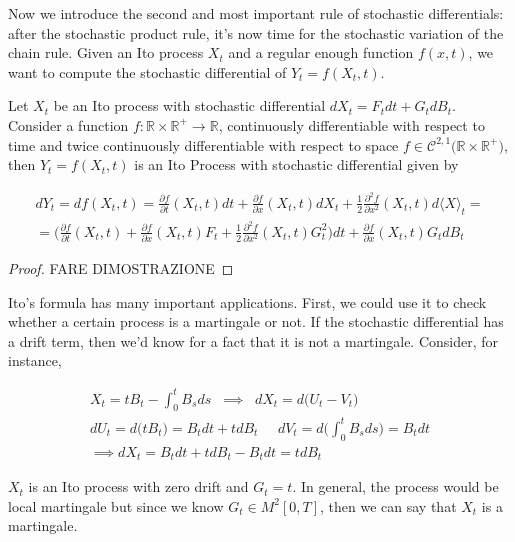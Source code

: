 Now we introduce the second and most important rule of stochastic differentials: after the stochastic product rule, it's now time for the stochastic variation of the chain rule. Given an Ito process $X_t$ and a regular enough function $f(x,t)$, we want to compute the stochastic differential of $Y_t = f(X_t,t)$. 

\begin{theorem}
    Let $X_t$ be an Ito process with stochastic differential $dX_t = F_t dt + G_t dB_t$. Consider a function $f : \mathbb{R} \times \mathbb{R}^+ \to \mathbb{R}$, continuously differentiable with respect to time and twice continuously differentiable with respect to space $f \in \mathcal{C}^{2,1}\big(\mathbb{R} \times \mathbb{R}^+\big)$, then $Y_t = f(X_t,t)$ is an Ito Process with stochastic differential given by

    \begin{gather}
        dY_t = df(X_t,t) = \frac{\partial f}{\partial t}(X_t, t)dt+\frac{\partial f}{\partial x}(X_t,t) dX_t + \frac{1}{2}\frac{\partial^2 f}{\partial x^2}(X_t,t) d\langle X \rangle_t = \\
        = \Big( \frac{\partial f}{\partial t}(X_t,t) + \frac{\partial f}{\partial x}(X_t,t) F_t + \frac{1}{2} \frac{\partial^2 f}{\partial x^2}(X_t,t) G_t^2 \Big) dt + \frac{\partial f}{\partial x}(X_t,t) G_t dB_t
    \end{gather}
\end{theorem}
\begin{proof}
    FARE DIMOSTRAZIONE
\end{proof}

Ito's formula has many important applications. First, we could use it to check whether a certain process is a martingale or not. If the stochastic differential has a drift term, then we'd know for a fact that it is not a martingale. Consider, for instance,

\begin{gather*}
    X_t = t B_t - \int_0^t B_s ds \;\; \implies \;\; dX_t = d\big( U_t - V_t\big) \\
    dU_t = d \big( t B_t \big) = B_t dt + t dB_t \;\;\;\;\; dV_t = d \Bigg( \int_0^t B_s ds \Bigg) = B_t dt \\
    \implies dX_t = B_t dt + t dB_t - B_t dt = t dB_t
\end{gather*}

$X_t$ is an Ito process with zero drift and $G_t = t$. In general, the process would be local martingale but since we know $G_t \in M^2[0,T]$, then we can say that $X_t$ is a martingale. 


